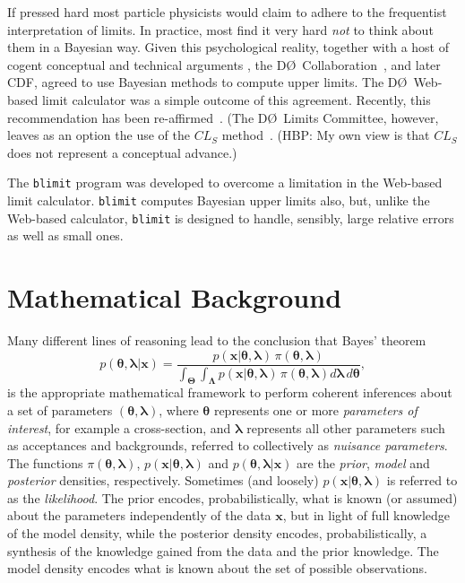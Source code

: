 \documentclass[preprint,eqsecnum,aps]{revtex4}
\newcommand{\btheta}{\mathbf{\theta}}
\newcommand{\blambda}{\mathbf{\lambda}}
\newcommand{\bTheta}{\mathbf \Theta}
\newcommand{\bLambda}{\mathbf \Lambda}
\newcommand{\bx}{\mathbf{x}}
\newcommand{\prior}[1]{\pi(#1)}
\newcommand{\pdf}[2]{p(#1|#2)}
\begin{document}
If pressed hard most
particle physicists would claim to adhere to the frequentist
interpretation of limits. In practice, most find it very hard
{\em not} to think about them in a Bayesian way. Given this
psychological reality, together with a host of cogent conceptual
and technical arguments \cite{BayesianArguments}, the D\O\
Collaboration~\cite{StatisticsWorkingGroup}, 
and later CDF, agreed to use Bayesian methods to
compute upper limits. The D\O\ Web-based limit
calculator was a simple outcome of this agreement. Recently,
this recommendation has been re-affirmed~\cite{Landsberg}. (The D\O\ 
Limits Committee, however, leaves as an option the 
use of the $CL_S$ method~\cite{CLS}. (HBP: My own view is
that $CL_S$ does not represent a conceptual advance.)

The {\tt blimit} program was developed to overcome a limitation in
the Web-based limit calculator. {\tt blimit} computes Bayesian
upper limits also, but, unlike the Web-based calculator,
{\tt blimit} is designed to handle, sensibly, large relative errors
as well as small ones.

\section{Mathematical Background}
Many different lines of reasoning \cite{BayesianArguments} lead to
the conclusion that Bayes' theorem
\begin{equation}
\label{eq:BayesTheorem} \pdf{\btheta, \blambda}{\bx} =
\frac{\pdf{\bx}{\btheta, \blambda} \, \prior{\btheta, \blambda}
}{\int_{\bTheta} \int_{\bLambda}\pdf{\bx}{\btheta, \blambda} \,
\prior{\btheta, \blambda} d\blambda \, d\btheta},
\end{equation}
is the appropriate mathematical framework to perform coherent
inferences about a set of parameters $(\btheta,\blambda)$, where
$\btheta$ represents one or more {\em parameters of interest}, for
example a cross-section, and $\blambda$ represents all other
parameters such as acceptances and backgrounds, referred to
collectively as {\em nuisance parameters}. The functions
$\prior{\btheta, \blambda}$, $\pdf{\bx}{\btheta, \blambda}$ and
$\pdf{\btheta, \blambda}{\bx}$ are the {\em prior}, {\em model}
and {\em posterior} densities, respectively. Sometimes (and
loosely) $\pdf{\bx}{\btheta, \blambda}$ is referred to as the {\em
likelihood}. 
The prior encodes, probabilistically, what is known (or assumed)
about the parameters independently of the data $\bx$, but in light
of full knowledge of the model density, while the posterior
density encodes, probabilistically, a synthesis of the knowledge
gained from the data and the prior knowledge. The model density
encodes what is known about the set of possible observations.
\end{document}
